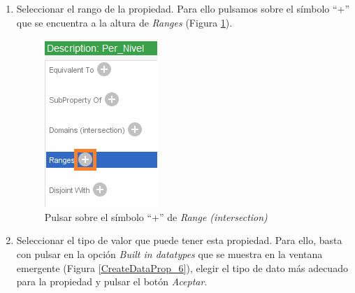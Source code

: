 \begin{enumerate}
    \item Seleccionar el rango de la propiedad. Para ello pulsamos sobre el símbolo “+” que se encuentra a la altura de 
    \textit{Ranges} (Figura \ref*{CreateDataProp_5}).
    \begin{figure}[H]
        \centering
        \includegraphics[scale=0.6]{Figures/Protege/CreateDataProp_5.png}
        \caption{Pulsar sobre el símbolo “+” de \textit{Range (intersection)}}
        \label{CreateDataProp_5}
    \end{figure}

    \item Seleccionar el tipo de valor que puede tener esta propiedad. Para ello, basta con pulsar en la opción 
    \textit{Built in datatypes} que se muestra en la ventana emergente (Figura \ref*{CreateDataProp_6}), elegir 
    el tipo de dato más adecuado para la propiedad y pulsar el botón \textit{Aceptar}.


\end{enumerate}
